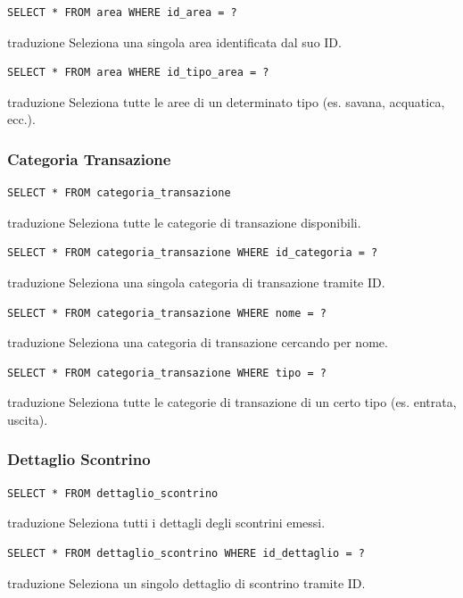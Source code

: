 \documentclass[12pt,a4paper]{report}
\begin{document}
\begin{lstlisting}[style=sqlstyle]
SELECT * FROM area WHERE id_area = ?
\end{lstlisting}
traduzione {Seleziona una singola area identificata dal suo ID.}

\begin{lstlisting}[style=sqlstyle]
SELECT * FROM area WHERE id_tipo_area = ?
\end{lstlisting}
traduzione {Seleziona tutte le aree di un determinato tipo (es. savana, acquatica, ecc.).}

\subsubsection*{Categoria Transazione}
\begin{lstlisting}[style=sqlstyle]
SELECT * FROM categoria_transazione
\end{lstlisting}
traduzione {Seleziona tutte le categorie di transazione disponibili.}

\begin{lstlisting}[style=sqlstyle]
SELECT * FROM categoria_transazione WHERE id_categoria = ?
\end{lstlisting}
traduzione {Seleziona una singola categoria di transazione tramite ID.}

\begin{lstlisting}[style=sqlstyle]
SELECT * FROM categoria_transazione WHERE nome = ?
\end{lstlisting}
traduzione {Seleziona una categoria di transazione cercando per nome.}

\begin{lstlisting}[style=sqlstyle]
SELECT * FROM categoria_transazione WHERE tipo = ?
\end{lstlisting}
traduzione {Seleziona tutte le categorie di transazione di un certo tipo (es. entrata, uscita).}

\subsubsection*{Dettaglio Scontrino}
\begin{lstlisting}[style=sqlstyle]
SELECT * FROM dettaglio_scontrino
\end{lstlisting}
traduzione {Seleziona tutti i dettagli degli scontrini emessi.}

\begin{lstlisting}[style=sqlstyle]
SELECT * FROM dettaglio_scontrino WHERE id_dettaglio = ?
\end{lstlisting}
traduzione {Seleziona un singolo dettaglio di scontrino tramite ID.}
\end{document}
